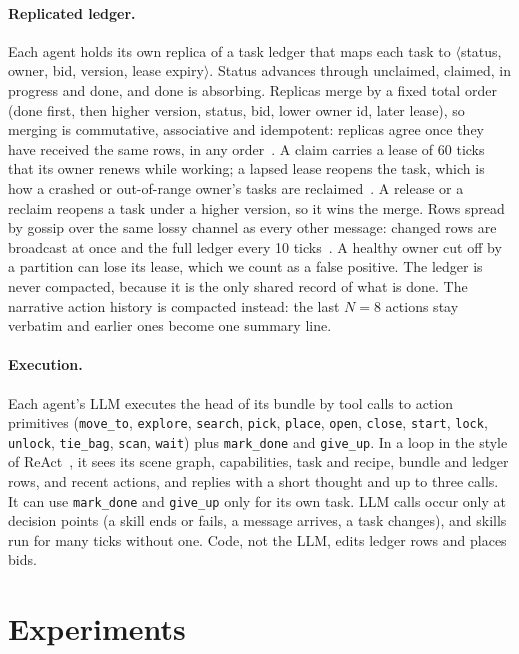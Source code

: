 \documentclass[letterpaper]{article}
\begin{document}
\paragraph{Replicated ledger.}
Each agent holds its own replica of a task ledger that maps each task to $\langle$status, owner, bid, version, lease expiry$\rangle$. Status advances through unclaimed, claimed, in progress and done, and done is absorbing. Replicas merge by a fixed total order (done first, then higher version, status, bid, lower owner id, later lease), so merging is commutative, associative and idempotent: replicas agree once they have received the same rows, in any order~\citep{shapiro2011crdt}. A claim carries a lease of 60 ticks that its owner renews while working; a lapsed lease reopens the task, which is how a crashed or out-of-range owner's tasks are reclaimed~\citep{gray1989leases}. A release or a reclaim reopens a task under a higher version, so it wins the merge. Rows spread by gossip over the same lossy channel as every other message: changed rows are broadcast at once and the full ledger every 10 ticks~\citep{demers1987epidemic}. A healthy owner cut off by a partition can lose its lease, which we count as a false positive. The ledger is never compacted, because it is the only shared record of what is done. The narrative action history is compacted instead: the last $N=8$ actions stay verbatim and earlier ones become one summary line.

\paragraph{Execution.}
Each agent's LLM executes the head of its bundle by tool calls to action primitives (\texttt{move\_to}, \texttt{explore}, \texttt{search}, \texttt{pick}, \texttt{place}, \texttt{open}, \texttt{close}, \texttt{start}, \texttt{lock}, \texttt{unlock}, \texttt{tie\_bag}, \texttt{scan}, \texttt{wait}) plus \texttt{mark\_done} and \texttt{give\_up}. In a loop in the style of ReAct~\citep{yao2023react}, it sees its scene graph, capabilities, task and recipe, bundle and ledger rows, and recent actions, and replies with a short thought and up to three calls. It can use \texttt{mark\_done} and \texttt{give\_up} only for its own task. LLM calls occur only at decision points (a skill ends or fails, a message arrives, a task changes), and skills run for many ticks without one. Code, not the LLM, edits ledger rows and places bids.

\section{Experiments}
\end{document}
